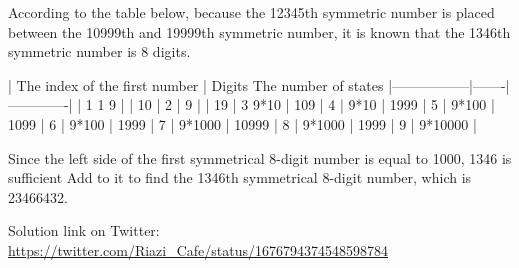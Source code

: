 \begin{solution}
According to the table below, because the 12345th symmetric number is placed between the 10999th and 19999th symmetric number, it is known that the 1346th symmetric number is 8 digits.


| The index of the first number | Digits The number of states
|-----------------|-------|-------------|
| 1 1 9 |
| 10 | 2 | 9 |
| 19 | 3 9*10
| 109 | 4 | 9*10
| 1999 | 5 | 9*100
| 1099 | 6 | 9*100
| 1999 | 7 | 9*1000
| 10999 | 8 | 9*1000
| 1999 | 9 | 9*10000 |


Since the left side of the first symmetrical 8-digit number is equal to 1000, 1346 is sufficient
Add to it to find the 1346th symmetrical 8-digit number, which is 23466432.

Solution link on Twitter:  \href{https://twitter.com/Riazi_Cafe/status/1676794374548598784}{https://twitter.com/Riazi_Cafe/status/1676794374548598784}\end{solution}